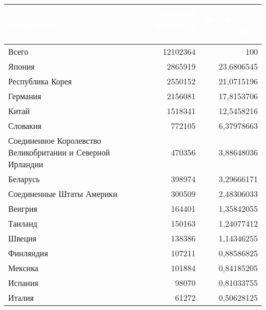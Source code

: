\footnotesize{
\begin{tabularx}{\textwidth}{|X|r|r|}
    \hline
\rowcolor{black} \textcolor{white}{\textbf{Экспортеры}} & \textcolor{white}{\textbf{стоимость Импорта в 2021}} & \textcolor{white}{\textbf{Доля импорта в 2021}} \\ \hline
Всего & 12102364 & 100 \\ \hline
Япония & 2865919 & 23,6806545 \\ \hline
Республика Корея & 2550152 & 21,0715196 \\ \hline
Германия & 2156081 & 17,8153706 \\ \hline
Китай & 1518341 & 12,5458216 \\ \hline
Словакия & 772105 & 6,37978663 \\ \hline
Соединенное Королевство Великобритании и Северной Ирландии & 470356 & 3,88648036 \\ \hline
Беларусь & 398974 & 3,29666171 \\ \hline
Соединенные Штаты Америки & 300509 & 2,48306033 \\ \hline
Венгрия & 164401 & 1,35842055 \\ \hline
Таиланд & 150163 & 1,24077412 \\ \hline
Швеция & 138386 & 1,14346255 \\ \hline
Финляндия & 107211 & 0,88586825 \\ \hline
Мексика & 101884 & 0,84185205 \\ \hline
Испания & 98070 & 0,81033755 \\ \hline
Италия & 61272 & 0,50628125 \\ \hline
\end{tabularx}
}